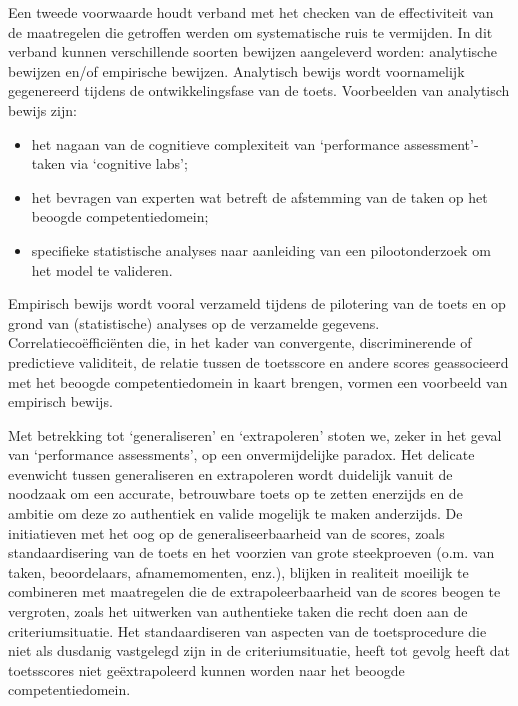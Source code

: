 \documentclass[
  letterpaper,
]{report}
\providecommand{\tightlist}{%
  \setlength{\itemsep}{0pt}\setlength{\parskip}{0pt}}
\begin{document}
Een tweede voorwaarde houdt verband met het checken van de effectiviteit
van de maatregelen die getroffen werden om systematische ruis te
vermijden. In dit verband kunnen verschillende soorten bewijzen
aangeleverd worden: analytische bewijzen en/of empirische bewijzen.
Analytisch bewijs wordt voornamelijk gegenereerd tijdens de
ontwikkelingsfase van de toets. Voorbeelden van analytisch bewijs zijn:

\begin{itemize}
\tightlist
\item
  het nagaan van de cognitieve complexiteit van `performance
  assessment'-taken via `cognitive labs';
\item
  het bevragen van experten wat betreft de afstemming van de taken op
  het beoogde competentiedomein;
\item
  specifieke statistische analyses naar aanleiding van een
  pilootonderzoek om het model te valideren.
\end{itemize}

Empirisch bewijs wordt vooral verzameld tijdens de pilotering van de
toets en op grond van (statistische) analyses op de verzamelde gegevens.
Correlatiecoëfficiënten die, in het kader van convergente,
discriminerende of predictieve validiteit, de relatie tussen de
toetsscore en andere scores geassocieerd met het beoogde
competentiedomein in kaart brengen, vormen een voorbeeld van empirisch
bewijs.

Met betrekking tot `generaliseren' en `extrapoleren' stoten we, zeker in
het geval van `performance assessments', op een onvermijdelijke paradox.
Het delicate evenwicht tussen generaliseren en extrapoleren wordt
duidelijk vanuit de noodzaak om een accurate, betrouwbare toets op te
zetten enerzijds en de ambitie om deze zo authentiek en valide mogelijk
te maken anderzijds. De initiatieven met het oog op de
generaliseerbaarheid van de scores, zoals standaardisering van de toets
en het voorzien van grote steekproeven (o.m. van taken, beoordelaars,
afnamemomenten, enz.), blijken in realiteit moeilijk te combineren met
maatregelen die de extrapoleerbaarheid van de scores beogen te
vergroten, zoals het uitwerken van authentieke taken die recht doen aan
de criteriumsituatie. Het standaardiseren van aspecten van de
toetsprocedure die niet als dusdanig vastgelegd zijn in de
criteriumsituatie, heeft tot gevolg heeft dat toetsscores niet
geëxtrapoleerd kunnen worden naar het beoogde competentiedomein.
\end{document}
